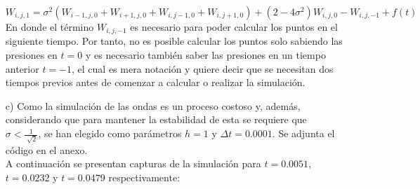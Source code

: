 \documentclass[letterpaper]{article}
\newcommand{\5}
{
\\[.5cm]
}
\begin{document}
\begin{itemize}
   \begin{equation}
   	W_{i,j,1}= \sigma^2(W_{i-1,j,0}+W_{i+1,j,0}+W_{i,j-1,0}+W_{i,j+1,0}) + (2 - 4\sigma^2)W_{i,j,0} - W_{i,j,-1} + f(t)
   \end{equation}
   En donde el término $W_{i,j,-1}$ es necesario para poder calcular los puntos en el siguiente tiempo. Por tanto, no es posible calcular los puntos solo sabiendo las presiones en $t = 0$ y es necesario también saber las presiones en un tiempo anterior $t = -1$, el cual es mera notación y quiere decir que se necesitan dos tiempos previos antes de comenzar a calcular o realizar la simulación.
   \item[c)] Como la simulación de las ondas es un proceso costoso y, además, considerando que para mantener la estabilidad de esta se requiere que $\sigma < \frac{1}{\sqrt[]{2}}$, se han elegido como parámetros $h = 1$ y $\Delta t = 0.0001$. Se adjunta el código en el anexo. \\
   A continuación se presentan capturas de la simulación para $t = 0.0051$, $t = 0.0232$ y $t = 0.0479$ respectivamente:
   

\end{itemize}
\end{document}
